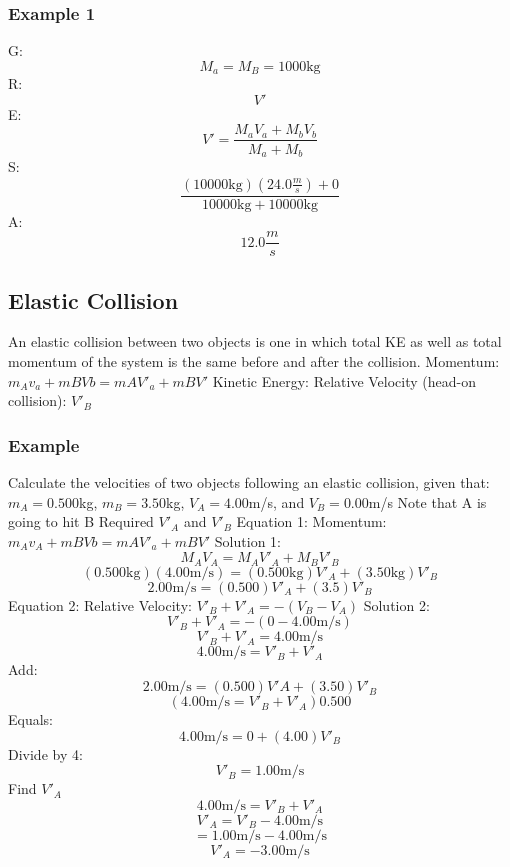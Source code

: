 \documentclass{article}
\begin{document}
\subsubsection*{Example 1}
G:
$$M_a=M_B = 1000\text{kg}$$
R: $$V'$$
E: $$V'=\frac{M_aV_a+M_bV_b}{M_a+M_b}$$
S: $$\frac{(10000\text{kg})(24.0\frac{m}{s})+0}{10000\text{kg}+10000\text{kg}}$$
A: $$12.0\frac{m}{s}$$
\subsection*{Elastic Collision}
An elastic collision between two objects is one in which total KE as well as total momentum of the system is the same before and after the collision.
Momentum: $m_Av_a+mBVb=mAV'_a+mBV'$
Kinetic Energy:
Relative Velocity (head-on collision): $V'_B$


\subsubsection*{Example}
Calculate the velocities of two objects following an elastic collision, given that:
$m_A=0.500$kg, $m_B=3.50$kg, $V_A=4.00$m/s, and $V_B=0.00$m/s
Note that A is going to hit B
Required
$V'_A$ and $V'_B$ 
Equation 1:
Momentum: $m_Av_A+mBVb=mAV'_a+mBV'$
Solution 1: 
$$M_AV_A=M_AV'_A+M_BV'_B$$
$$(0.500\text{kg})(4.00\text{m/s})=(0.500\text{kg})V'_A+(3.50\text{kg})V'_B$$
$$2.00\text{m/s}=(0.500)V'_A+(3.5)V'_B$$
Equation 2:
Relative Velocity: $V'_B+V'_A=-(V_B-V_A)$
Solution 2:
$$V'_B+V'_A=-(0-4.00\text{m/s})$$
$$V'_B+V'_A=4.00\text{m/s}$$
$$4.00\text{m/s}=V'_B+V'_A$$
Add:
$$2.00\text{m/s}=(0.500)V'A+(3.50)V'_B$$
$$(4.00\text{m/s}=V'_B+V'_A)0.500$$
Equals:
$$4.00\text{m/s}=0+(4.00)V'_B$$
Divide by 4:
$$V'_B=1.00\text{m/s}$$
Find $V'_A$
$$4.00\text{m/s}=V'_B+V'_A$$
$$V'_A=V'_B-4.00\text{m/s}$$
$$=1.00\text{m/s}-4.00\text{m/s}$$
$$V'_A=-3.00\text{m/s}$$
\end{document}
